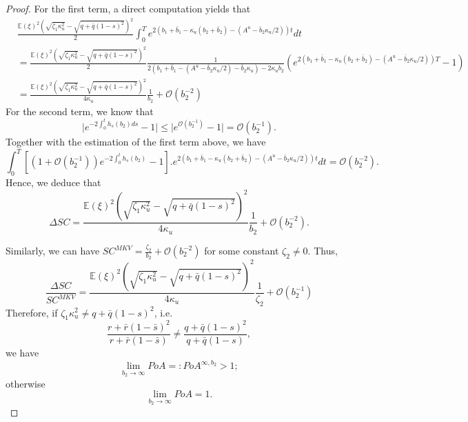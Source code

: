 \documentclass[11pt]{article}
\begin{document}
\begin{proof}
	For the first term, a direct computation yields that
	\begin{equation*}
	\begin{array}{rl}
	&\frac{ \mathbb{E}(\xi)^2 (\sqrt{\zeta_1 \kappa_u^2} - \sqrt{q+\bar{q}(1-s)^2}) ^2}{2} \int_0^T e^{2 (b_1+\bar{b}_1 - \kappa_u (b_2 + \bar{b}_2) - (A^u - \bar{b}_2 \kappa_u / 2) ) t} dt \\
	&= \frac{ \mathbb{E}(\xi)^2 (\sqrt{\zeta_1 \kappa_u^2} - \sqrt{q+\bar{q}(1-s)^2}) ^2}{2} \frac{1}{2(b_1 + \bar{b}_1- (A^u - \bar{b}_2 \kappa_u /2) - \bar{b}_2 \kappa_u) - 2 \kappa_u b_2} \left(e^{2 (b_1+\bar{b}_1 - \kappa_u (b_2 + \bar{b}_2) - (A^u - \bar{b}_2 \kappa_u / 2) ) T} -1 \right) \\
	&= \frac{\mathbb{E}(\xi)^2 (\sqrt{\zeta_1 \kappa_u^2} - \sqrt{q+\bar{q}(1-s)^2}) ^2}{4 \kappa_u} \frac{1}{b_2} + \mathcal{O}(b_2^{-2})
	\end{array}
	\end{equation*}
	For the second term, we know that 
	$$ \vert e^{-2\int_0^t h_s(b_2) ds} - 1 \vert \leq \vert e^{ \mathcal{O}(b_2^{-1}) } -1 \vert = \mathcal{O}(b_2^{-1}).$$
	Together with the estimation of the first term above, we have 
	$$ \int_0^T \left[ (1 + \mathcal{O}(b_2^{-1}) ) e^{-2 \int_0^t h_s(b_2)} -1\right]. e^{2 (b_1+\bar{b}_1 - \kappa_u (b_2 + \bar{b}_2) - (A^u - \bar{b}_2 \kappa_u / 2) ) t}  dt = \mathcal{O}(b_2^{-2}).$$
	Hence, we deduce that
	\begin{equation}
		\Delta SC = \frac{\mathbb{E}(\xi)^2 (\sqrt{\zeta_1 \kappa_u^2} - \sqrt{q+\bar{q}(1-s)^2}) ^2}{4 \kappa_u} \frac{1}{b_2} + \mathcal{O}(b_2^{-2}).
	\end{equation}
	
	Similarly, we can have $SC^{MKV} =  \frac{\zeta_2}{b_2} + \mathcal{O}(b_2^{-2})$
	for some constant $\zeta_2 \neq 0$. Thus,
	\begin{equation}
		\frac{\Delta SC}{SC^{MKV}} = \frac{\mathbb{E}(\xi)^2 (\sqrt{\zeta_1 \kappa_u^2} - \sqrt{q+\bar{q}(1-s)^2}) ^2}{4 \kappa_u} \frac{1}{\zeta_2} + \mathcal{O}(b_2^{-1})
	\end{equation}
	Therefore, if $ \zeta_1 \kappa_u^2 \neq q + \bar{q}(1-s)^2$, i.e.
	$$\frac{r + \bar{r}(1-\bar{s})^2}{r + \bar{r}(1-\bar{s})} \neq \frac{q + \bar{q}(1-s)^2}{q + \bar{q}(1-s)},$$
	we have
	$$ \lim_{b_2 \to \infty} PoA =: PoA^{\infty,b_2} > 1;$$
	otherwise $$ \lim_{b_2 \to \infty} PoA = 1.$$ 
	
\end{proof}
\end{document}
